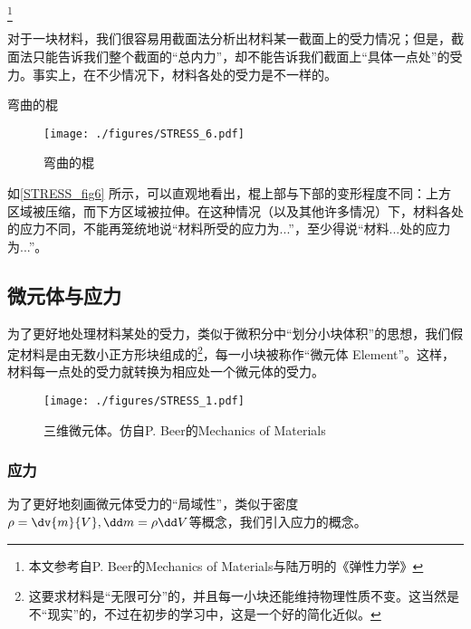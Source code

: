 
\begin{issues}
\issueTODO
\end{issues}

\footnote{本文参考自P. Beer的Mechanics of Materials与陆万明的《弹性力学》}

对于一块材料，我们很容易用截面法分析出材料某一截面上的受力情况；但是，截面法只能告诉我们整个截面的“总内力”，却不能告诉我们截面上“具体一点处”的受力。事实上，在不少情况下，材料各处的受力是不一样的。

\begin{example}{弯曲的棍}
\begin{figure}[ht]
\centering
\texttt{[image: ./figures/STRESS\_6.pdf]}
\caption{弯曲的棍} \label{STRESS_fig6}
\end{figure}
如\autoref{STRESS_fig6} 所示，可以直观地看出，棍上部与下部的变形程度不同：上方区域被压缩，而下方区域被拉伸。在这种情况（以及其他许多情况）下，材料各处的应力不同，不能再笼统地说“材料所受的应力为...”，至少得说“材料...处的应力为...”。

\end{example}

\subsection{微元体与应力}
为了更好地处理材料某处的受力，类似于微积分中“划分小块体积”的思想，我们假定材料是由无数小正方形块组成的\footnote{这要求材料是“无限可分”的，并且每一小块还能维持物理性质不变。这当然是不“现实”的，不过在初步的学习中，这是一个好的简化近似。}，每一小块被称作“微元体 Element”。这样，材料每一点处的受力就转换为相应处一个微元体的受力。

\begin{figure}[ht]
\centering
\texttt{[image: ./figures/STRESS\_1.pdf]}
\caption{三维微元体。仿自P. Beer的Mechanics of Materials} \label{STRESS_fig1}
\end{figure}

\subsubsection{应力}

为了更好地刻画微元体受力的“局域性”，类似于密度$\rho=\dv{m}{V}, \dd m = \rho \dd V$等概念，我们引入应力的概念。

